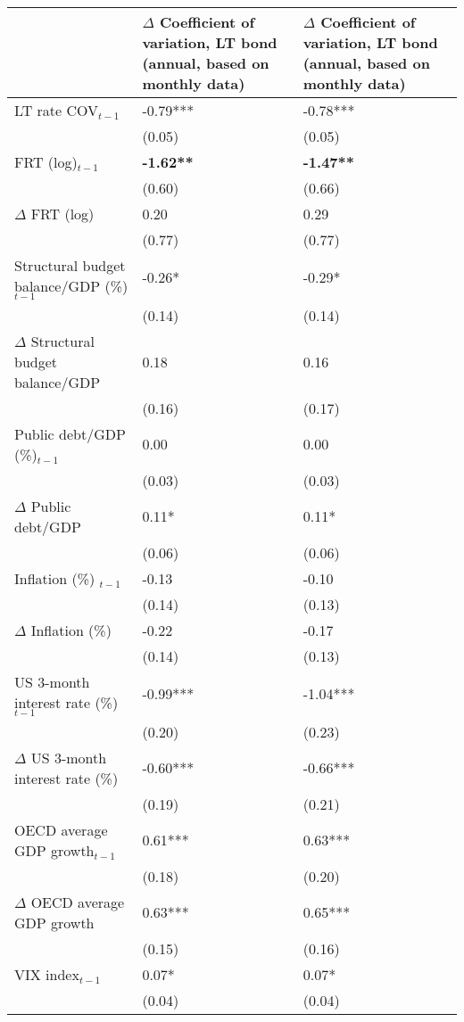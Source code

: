 {\tiny
\begin{tabular}{lp{2cm}p{2cm}}
  \hline
 & $\Delta$ Coefficient of variation, LT bond (annual, based on monthly data) & $\Delta$ Coefficient of variation, LT bond (annual, based on monthly data) \\ 
  \hline
LT rate COV$_{t-1}$ & -0.79*** & -0.78*** \\ 
   & (0.05) & (0.05) \\ 
  FRT (log)$_{t-1}$ & \textbf{-1.62**} & \textbf{-1.47**} \\ 
   & (0.60) & (0.66) \\ 
  $\Delta$ FRT (log) & 0.20 & 0.29 \\ 
   & (0.77) & (0.77) \\ 
  Structural budget balance/GDP (\%)$_{t-1}$ & -0.26* & -0.29* \\ 
   & (0.14) & (0.14) \\ 
  $\Delta$ Structural budget balance/GDP & 0.18 & 0.16 \\ 
   & (0.16) & (0.17) \\ 
  Public debt/GDP (\%)$_{t-1}$ & 0.00 & 0.00 \\ 
   & (0.03) & (0.03) \\ 
  $\Delta$ Public debt/GDP & 0.11* & 0.11* \\ 
   & (0.06) & (0.06) \\ 
  Inflation (\%) $_{t-1}$ & -0.13 & -0.10 \\ 
   & (0.14) & (0.13) \\ 
  $\Delta$ Inflation (\%) & -0.22 & -0.17 \\ 
   & (0.14) & (0.13) \\ 
  US 3-month interest rate (\%)$_{t-1}$ & -0.99*** & -1.04*** \\ 
   & (0.20) & (0.23) \\ 
  $\Delta$ US 3-month interest rate (\%) & -0.60*** & -0.66*** \\ 
   & (0.19) & (0.21) \\ 
  OECD average GDP growth$_{t-1}$ & 0.61*** & 0.63*** \\ 
   & (0.18) & (0.20) \\ 
  $\Delta$ OECD average GDP growth & 0.63*** & 0.65*** \\ 
   & (0.15) & (0.16) \\ 
  VIX index$_{t-1}$ & 0.07* & 0.07* \\ 
   & (0.04) & (0.04) \\ 

\end{tabular}}
